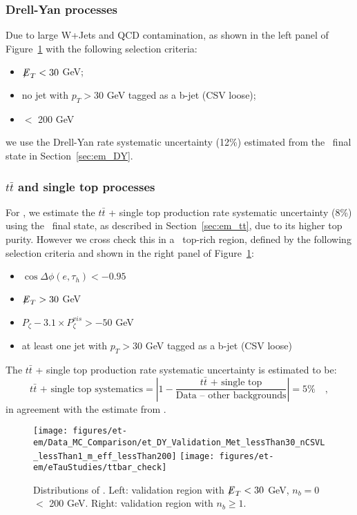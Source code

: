 \subsubsection{Drell-Yan processes}
Due to large W+Jets and QCD contamination, as shown in the left panel of 
Figure~\ref{fig:et_dy_tt} with the following selection criteria:
\begin{itemize}
  \item ${\not\mathrel{E}}_T<30$ GeV;
  \item no jet with $p_T>30$ GeV tagged as a b-jet (CSV loose);
  \item \meffetau $<$ 200 GeV
\end{itemize}
we use the Drell-Yan rate systematic uncertainty (12\%) estimated from
the \tetm ~final state in Section~\ref{sec:em_DY}.

\subsubsection{$t\bar{t}$ and single top processes}
For \teth, we estimate the $t\bar{t}$ + single top production rate
systematic uncertainty (8\%) using the \tetm ~final state, as described in
Section~\ref{sec:em_tt}, due to its higher top purity.  However we cross
check this in a \teth ~top-rich region, defined by the following
selection criteria and shown in the right panel of Figure~\ref{fig:et_dy_tt}:
\begin{itemize}
  \item $\cos{\Delta \phi (e,\tau_{h})}<-0.95$
  \item ${\not\mathrel{E}}_T>30$ GeV
  \item $P_{\zeta}- 3.1 \times P_{\zeta}^{vis} > -50$ GeV
  \item at least one jet with $p_T>30$ GeV tagged as a b-jet (CSV loose)
\end{itemize}
The $t\bar{t}$ + single top production rate systematic uncertainty is estimated to be:
\begin{equation}\label{eq:et_tt}
\text{$t\bar{t}$ + single top systematics} = \left| 1 - \frac{\text{$t\bar{t}$ + single top}}{\text{Data -- other backgrounds}}\right| = 5\%\quad,
\end{equation}
in agreement with the estimate from \tetm.

\begin{figure}[thbp!]\centering
  \texttt{[image: figures/et-em/Data\_MC\_Comparison/et\_DY\_Validation\_Met\_lessThan30\_nCSVL\_lessThan1\_m\_eff\_lessThan200]}
  \texttt{[image: figures/et-em/eTauStudies/ttbar\_check]}
  \caption{\label{fig:et_dy_tt} Distributions of \meffetau. Left: validation region with ${\not\mathrel{E}}_T<30$ GeV, $n_b = 0$ \meffetau $<$ 200 GeV.  Right: validation region with $n_b\geq1$.}
\end{figure}

